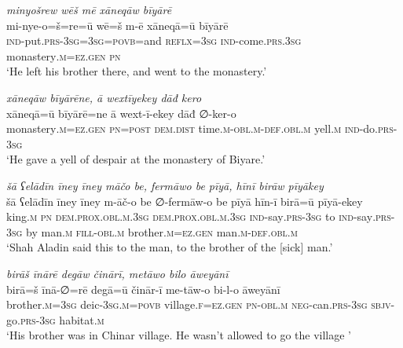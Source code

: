 \ea \label{DG.32}
\textit{minyošrew wēš mē xāneqāw bīyārē} \\ 
\gll mi-nye-o=š=re=ū wē=š m-ē xāneqā=ū bīyārē \\ 
 \textsc{ind-}put\textsc{.prs}\textsc{-3sg}\textsc{=3sg}\textsc{=\textsc{povb}}=and \textsc{reflx}\textsc{=3sg} \textsc{ind-}come\textsc{.prs}\textsc{.3sg} monastery\textsc{.m}\textsc{=ez}\textsc{.gen} \textsc{pn} \\ 
\glt `He left his brother there, and went to the monastery.'
\z 
 
\ea \label{DG.33}
\textit{xāneqāw bīyārēne, ā wextīyekey dāđ kero} \\ 
\gll xāneqā=ū bīyārē=ne ā wext-ī-ekey dāđ ∅-ker-o \\ 
 monastery\textsc{.m}\textsc{=ez}\textsc{.gen} \textsc{pn}\textsc{=\textsc{post}} \textsc{dem.dist} time\textsc{.m}\textsc{-obl}\textsc{.m}\textsc{-def}\textsc{.obl}\textsc{.m} yell\textsc{.m} \textsc{ind-}do\textsc{.prs}\textsc{-3sg} \\ 
\glt `He gave a yell of despair at the monastery of Biyare.'
\z 
 
\ea \label{DG.53}
\textit{šā ʕelādīn īney īney māčo be, fermāwo be pīyā, hīnī birāw pīyākey} \\ 
\gll šā ʕelādīn īney īney m-āč-o be ∅-fermāw-o be pīyā hīn-ī birā=ū pīyā-ekey \\ 
 king\textsc{.m} \textsc{pn} \textsc{dem.prox}\textsc{.obl}\textsc{.m}\textsc{.3sg} \textsc{dem.prox}\textsc{.obl}\textsc{.m}\textsc{.3sg} \textsc{ind-}say\textsc{.prs}\textsc{-3sg} to \textsc{ind-}say\textsc{.prs}\textsc{-3sg} by man\textsc{.m} \textsc{fill}\textsc{-obl}\textsc{.m} brother\textsc{.m}\textsc{=ez}\textsc{.gen} man\textsc{.m}\textsc{-def}\textsc{.obl}\textsc{.m} \\ 
\glt `Shah Aladin said this to the man, to the brother of the [sick] man.'
\z 
 
\ea \label{DG.54}
\textit{birāš īnārē degāw činārī, metāwo bilo āweyānī} \\ 
\gll birā=š īnā-∅=rē degā=ū činār-ī me-tāw-o bi-l-o āweyānī \\ 
 brother\textsc{.m}\textsc{=3sg} deic\textsc{-3sg}\textsc{.m}\textsc{=\textsc{povb}} village\textsc{\textsc{.f}}\textsc{=ez}\textsc{.gen} \textsc{pn}\textsc{-obl}\textsc{.m} \textsc{neg-}can\textsc{.prs}\textsc{-3sg} \textsc{sbjv-}go\textsc{.prs}\textsc{-3sg} habitat\textsc{\textsc{.m}} \\ 
\glt `His brother was in Chinar village. He wasn’t allowed to go the village '
\z 
 
